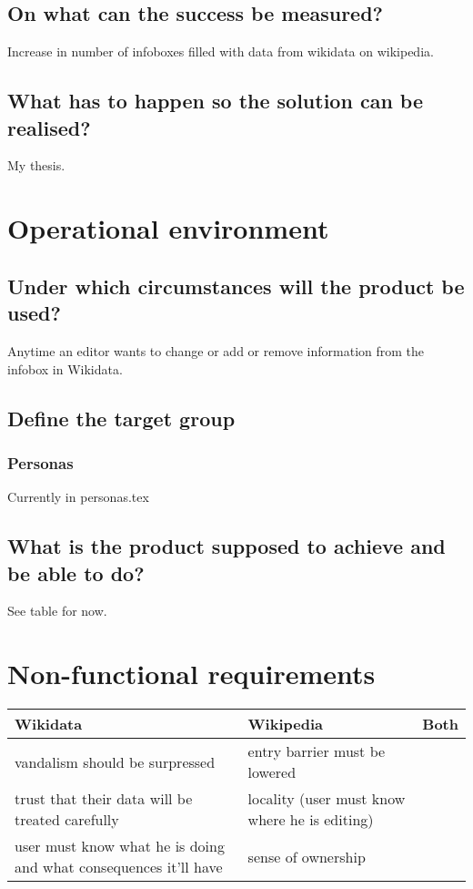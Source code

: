 \documentclass{article}
\begin{document}
\subsection{On what can the success be measured?}

Increase in number of infoboxes filled with data from wikidata on wikipedia.

\subsection{What has to happen so the solution can be realised?}

My thesis.

\pagebreak

\section{Operational environment}

\subsection{Under which circumstances will the product be used?}

Anytime an editor wants to change or add or remove information from the infobox in Wikidata.


\subsection{Define the target group}
\subsubsection{Personas}

Currently in personas.tex

\subsection{What is the product supposed to achieve and be able to do?}

See table for now.

\section{Non-functional requirements}


\begin{tabular}{| >{\raggedright\arraybackslash}p{4cm} | >{\raggedright\arraybackslash}p{4cm} | >{\raggedright\arraybackslash}p{4cm} |}
\hline
\textbf{Wikidata} & \textbf{Wikipedia} & \textbf{Both}  \\ \hline
vandalism should be surpressed & entry barrier must be lowered & \\ \hline
trust that their data will be treated carefully & locality (user must know where he is editing) & \\ \hline
user must know what he is doing and what consequences it'll have & sense of ownership & \\ \hline
\end{tabular}
\end{document}
